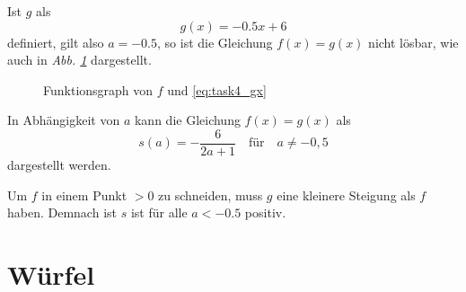 \documentclass[a4paper]{article}
\newcommand{\figref}[1]{\emph{Abb. \ref{#1}}}
\begin{document}
\begin{tasks}
    \item Ist $g$ als
    \begin{equation}\label{eq:task4_gx}
        g(x) = -0.5x + 6
    \end{equation}
    definiert, gilt also $a = -0.5$, so ist die Gleichung $f(x) = g(x)$ nicht lösbar, wie auch in \figref{fig:task4_f} dargestellt.

    \begin{figure}[!h]
        \centering
        \caption{Funktionsgraph von $f$ und \eqref{eq:task4_gx}}
        \label{fig:task4_f}
    \end{figure}

    \item In Abhängigkeit von $a$ kann die Gleichung $f(x) = g(x)$ als
    \begin{equation*}
        s(a) = -\frac{6}{2a+1} \quad\text{für}\quad a \neq -0,5
    \end{equation*}
    dargestellt werden.

    Um $f$ in einem Punkt $> 0$ zu schneiden, muss $g$ eine kleinere Steigung als $f$ haben. Demnach ist $s$ ist für alle $a < -0.5$ positiv.
\end{tasks}

\section{Würfel}
\end{document}
